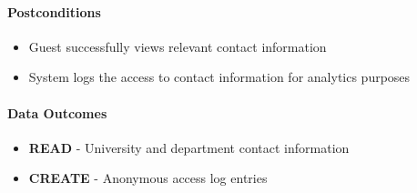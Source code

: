 \paragraph{Postconditions}
\begin{itemize}
    \item Guest successfully views relevant contact information
    \item System logs the access to contact information for analytics purposes
\end{itemize}

\paragraph{Data Outcomes}
\begin{itemize}
    \item \textbf{READ} - University and department contact information
    \item \textbf{CREATE} - Anonymous access log entries
\end{itemize}